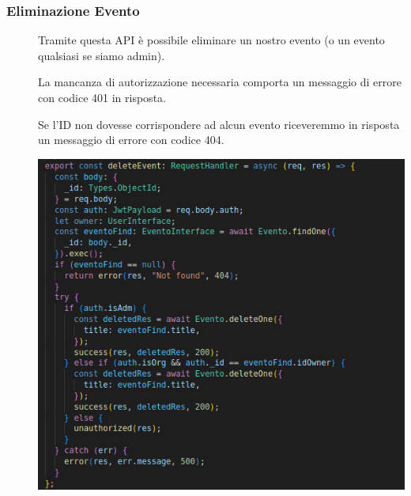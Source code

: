 \documentclass{article}
\begin{document}
\subsubsection{Eliminazione Evento}
\begin{description}
    \item[] Tramite questa API è possibile eliminare un nostro evento (o un evento qualsiasi se siamo admin).
    \item[] La mancanza di autorizzazione necessaria comporta un messaggio di errore con codice 401 in risposta.
    \item[] Se l'ID non dovesse corrispondere ad alcun evento riceveremmo in risposta un messaggio di errore con codice 404.
    \item[] \begin{center}
            \includegraphics[scale=0.5]{deleteEvent.png}
        \end{center}
\end{description}
\clearpage
\end{document}
